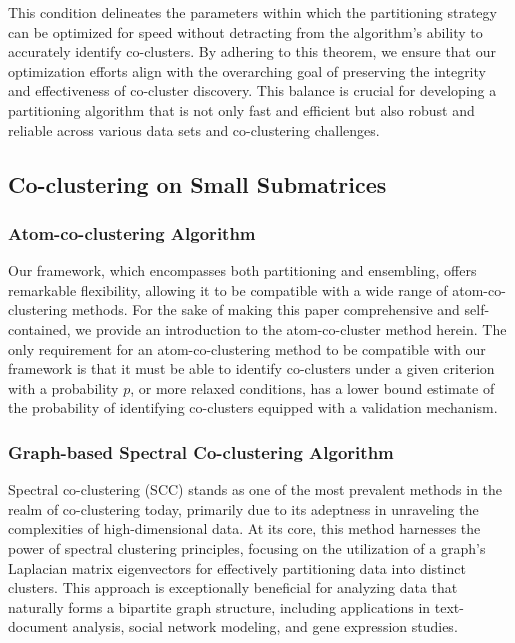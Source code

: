 This condition delineates the parameters within which the partitioning strategy can be optimized for speed without detracting from the algorithm's ability to accurately identify co-clusters. By adhering to this theorem, we ensure that our optimization efforts align with the overarching goal of preserving the integrity and effectiveness of co-cluster discovery. This balance is crucial for developing a partitioning algorithm that is not only fast and efficient but also robust and reliable across various data sets and co-clustering challenges.

\subsection{Co-clustering on Small Submatrices}

\subsubsection{Atom-co-clustering Algorithm}
Our framework, which encompasses both partitioning and ensembling, offers remarkable flexibility, allowing it to be compatible with a wide range of atom-co-clustering methods. For the sake of making this paper comprehensive and self-contained, we provide an introduction to the atom-co-cluster method herein. The only requirement for an atom-co-clustering method to be compatible with our framework is that it must be able to identify co-clusters under a given criterion with a probability $p$, or more relaxed conditions, has a lower bound estimate of the probability of identifying co-clusters equipped with a validation mechanism.

\subsubsection{Graph-based Spectral Co-clustering Algorithm}

Spectral co-clustering (SCC) stands as one of the most prevalent methods in the realm of co-clustering today\cite{vonluxburg2007TutorialSpectralClustering}, primarily due to its adeptness in unraveling the complexities of high-dimensional data. At its core, this method harnesses the power of spectral clustering principles, focusing on the utilization of a graph's Laplacian matrix eigenvectors for effectively partitioning data into distinct clusters. This approach is exceptionally beneficial for analyzing data that naturally forms a bipartite graph structure, including applications in text-document analysis, social network modeling, and gene expression studies.


